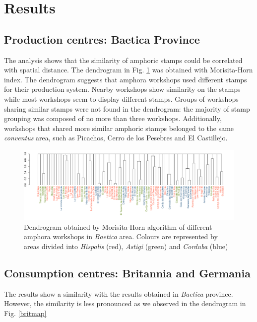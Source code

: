 \documentclass[review]{elsarticle}
\begin{document}
\section{Results}

\subsection{Production centres: Baetica Province}


The analysis shows that the similarity of amphoric stamps could be correlated with spatial distance. The dendrogram in Fig. \ref{dendro} was obtained with Morisita-Horn index. The dendrogram suggests that amphora workshops used different stamps for their production system. Nearby workshops show similarity on the stamps while most workshops seem to display different stamps. Groups of workshops sharing similar stamps were not found in the dendrogram: the majority of stamp grouping was composed of no more than three workshops. Additionally, workshops that shared more similar amphoric stamps belonged to the same \textit{conventus} area, such as Picachos, Cerro de los Pesebres and El Castillejo. 

\begin{figure}
	\centering
\includegraphics[angle=180, width=\linewidth]{figs/dendro}
\caption{Dendrogram obtained by Morisita-Horn algorithm of different amphora workshops in \textit{Baetica} area. Colours are represented by areas divided into \textit{Hispalis} (red), \textit{Astigi} (green) and \textit{Corduba} (blue)}
\label{dendro}
\end{figure} 


\subsection{Consumption centres: Britannia and Germania}


The results show a similarity with the results obtained in \textit{Baetica} province. However, the similarity is less pronounced as we observed in the dendrogram in Fig. \ref{britmap}
\end{document}
